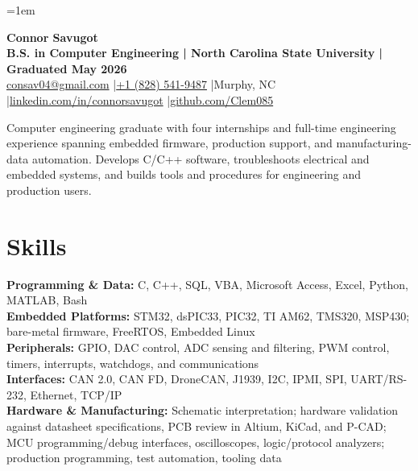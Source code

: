 \documentclass[10pt,letterpaper]{article}
\begin{document}
\fontsize{9.85}{10.85}\selectfont
\setlength{\RaggedRightRightskip}{0pt plus 5em}
\RaggedRight
\emergencystretch=1em

\begin{center}
  {\color{resumeBlue}\fontsize{24.5}{25.2}\selectfont\bfseries Connor Savugot}\\[2.5pt]
  {\bfseries B.S. in Computer Engineering | North Carolina State University | Graduated May 2026}\\[1.5pt]
  {\fontsize{9.6}{10.2}\selectfont
    \href{mailto:consav04@gmail.com}{consav04@gmail.com}
    \enspace|\enspace \href{tel:+18285419487}{+1 (828) 541-9487}
    \enspace|\enspace Murphy, NC
    \enspace|\enspace \href{https://linkedin.com/in/connorsavugot}{linkedin.com/in/connorsavugot}
    \enspace|\enspace \href{https://github.com/Clem085}{github.com/Clem085}}
\end{center}
\vspace{-0.18cm}

Computer engineering graduate with four internships and full-time engineering experience spanning embedded firmware, production support, and manufacturing-data automation. Develops C/C++ software, troubleshoots electrical and embedded systems, and builds tools and procedures for engineering and production users.

\section{Skills}
\textbf{Programming \& Data:} C, C++, SQL, VBA, Microsoft Access, Excel, Python, MATLAB, Bash\\
\textbf{Embedded Platforms:} STM32, dsPIC33, PIC32, TI AM62, TMS320, MSP430; bare-metal firmware, FreeRTOS, Embedded Linux\\
\textbf{Peripherals:} GPIO, DAC control, ADC sensing and filtering, PWM control, timers, interrupts, watchdogs, and communications\\
\textbf{Interfaces:} CAN 2.0, CAN FD, DroneCAN, J1939, I2C, IPMI, SPI, UART/RS-232, Ethernet, TCP/IP\\
\textbf{Hardware \& Manufacturing:} Schematic interpretation; hardware validation against datasheet specifications, PCB review in Altium, KiCad, and P-CAD; MCU programming/debug interfaces, oscilloscopes, logic/protocol analyzers; production programming, test automation, tooling data
\end{document}
